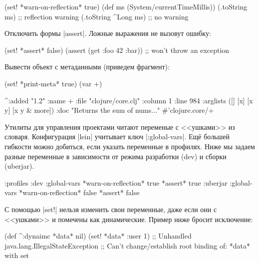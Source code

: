 \begin{english}
  \begin{clojure}
(set! *warn-on-reflection* true)
(def ms (System/currentTimeMillis))
(.toString ms)       ;; reflection warning
(.toString ^Long ms) ;; no warning
  \end{clojure}
\end{english}

\noindent
Отключить формы \spverb|assert|. Ложные выражения не вызовут ошибку:

\begin{english}
  \begin{clojure}
(set! *assert* false)
(assert (get {:foo 42} :bar))
;; won't throw an exception
  \end{clojure}
\end{english}

\noindent
Вывести объект с метаданными (приведем фрагмент):

\begin{english}
  \begin{clojure}
(set! *print-meta* true)
(var +)

^{:added "1.2"
  :name +
  :file "clojure/core.clj"
  :column 1
  :line 984
  :arglists ([] [x] [x y] [x y & more])
  :doc "Returns the sum of nums..."}
#'clojure.core/+
  \end{clojure}
\end{english}


Утилиты для управления проектами читают переменые с <<ушками>> из
словаря. Конфигурация \spverb|lein| учитывает ключ \spverb|:global-vars|. Ещ\"{е}
большей гибкости можно добиться, если указать переменные в профилях. Ниже мы
задаем разные переменные в зависимости от режима разработки (dev) и сборки
(uberjar).

\begin{english}
  \begin{clojure}
{:profiles
 :dev {:global-vars {*warn-on-reflection* true
                     *assert* true}}
 :uberjar {:global-vars {*warn-on-reflection* false
                         *assert* false}}}
  \end{clojure}
\end{english}

С помощью \spverb|set!| нельзя изменить свои переменные, даже если они с
<<ушками>> и помечены как динамические. Пример ниже бросит исключение:

\begin{english}
  \begin{clojure}
(def ^:dynaimc *data* nil)
(set! *data* {:user 1})
;; Unhandled java.lang.IllegalStateException
;; Can't change/establish root binding of: *data* with set
  \end{clojure}
\end{english}

